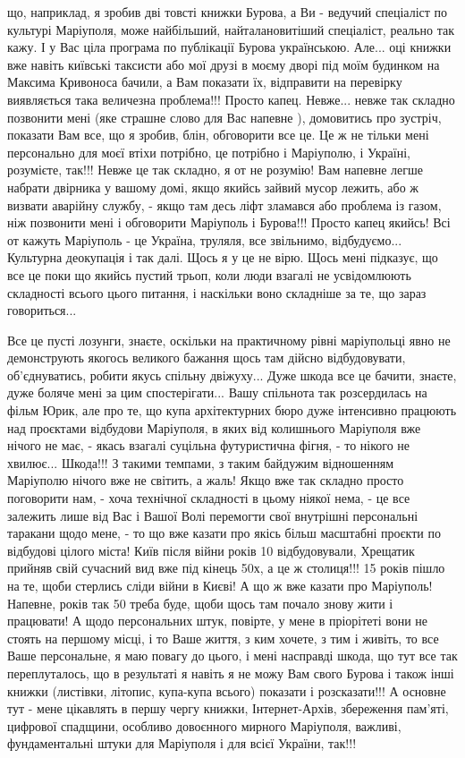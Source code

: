 що, наприклад, я зробив дві товсті книжки Бурова, а Ви - ведучий спеціаліст по
культурі Маріуполя, може найбільший, найталановитіший спеціаліст, реально так
кажу. І у Вас ціла програма по публікації Бурова українською. Але... оці книжки
вже навіть київські таксисти або мої друзі в моєму дворі під моїм будинком на
Максима Кривоноса бачили, а Вам показати їх, відправити на перевірку
виявляється така величезна проблема!!! Просто капец. Невже... невже так складно
позвонити мені (яке страшне слово для Вас напевне ), домовитись про зустріч,
показати Вам все, що я зробив, блін, обговорити все це. Це ж не тільки мені
персонально для моєї втіхи потрібно, це потрібно і Маріуполю, і Україні,
розумієте, так!!! Невже це так складно, я от не розумію! Вам напевне легше
набрати двірника у вашому домі, якщо якийсь зайвий мусор лежить, або ж визвати
аварійну службу, - якщо там десь ліфт зламався або проблема із газом, ніж
позвонити мені і обговорити Маріуполь і Бурова!!! Просто капец якийсь! Всі от
кажуть Маріуполь - це Україна, труляля, все звільнимо, відбудуємо... Культурна
деокупація і так далі. Щось я у це не вірю. Щось мені підказує, що все це поки
що якийсь пустий трьоп, коли люди взагалі не усвідомлюють складності всього
цього питання, і наскільки воно складніше за те, що зараз говориться...

Все це пусті лозунги, знаєте, оскільки на практичному рівні маріупольці явно не
демонструють якогось великого бажання щось там дійсно відбудовувати,
об'єднуватись, робити якусь спільну двіжуху... Дуже шкода все це бачити,
знаєте, дуже боляче мені за цим спостерігати... Вашу спільнота так розсердилась
на фільм Юрик, але про те, що купа архітектурних бюро дуже інтенсивно працюють
над проєктами відбудови Маріуполя, в яких від колишнього Маріуполя вже нічого
не має, - якась взагалі суцільна футуристична фігня, - то нікого не хвилює...
Шкода!!! З такими темпами, з таким байдужим відношенням Маріуполю нічого вже не
світить, а жаль! Якщо вже так складно просто поговорити нам, - хоча технічної
складності в цьому ніякої нема, - це все залежить лише від Вас і Вашої Волі
перемогти свої внутрішні персональні таракани щодо мене, - то що вже казати про
якісь більш масштабні проєкти по відбудові цілого міста! Київ після війни років
10 відбудовували, Хрещатик прийняв свій сучасний вид вже під кінець 50х, а це ж
столиця!!! 15 років пішло на те, щоби стерлись сліди війни в Києві! А що ж вже
казати про Маріуполь! Напевне, років так 50 треба буде, щоби щось там почало
знову жити і працювати! А щодо персональних штук, повірте, у мене в пріорітеті
вони не стоять на першому місці, і то Ваше життя, з ким хочете, з тим і живіть,
то все Ваше персональне, я маю повагу до цього, і мені насправді шкода, що тут
все так переплуталось, що в результаті я навіть я не можу Вам свого Бурова і
також інші книжки (листівки, літопис, купа-купа всього) показати і
розсказати!!! А основне тут - мене цікавлять в першу чергу книжки,
Інтернет-Архів, збереження пам'яті, цифрової спадщини, особливо довоєнного
мирного Маріуполя, важливі, фундаментальні штуки для Маріуполя і для всієї
України, так!!!
